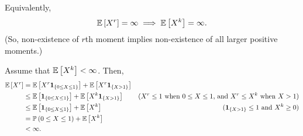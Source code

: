 \begin{enumerate}
\begin{proposition}
\begin{note}
Equivalently,
\[
\mathbb{E}\left[X^r\right]=\infty\implies \mathbb{E}\left[X^k\right]=\infty.
\]
(So, non-existence of \(r\)th moment implies non-existence of
all larger positive moments.)
\end{note}
\end{proposition}
\begin{pf}
Assume that \(\mathbb{E}\left[X^k\right]<\infty\). Then,
\begin{align*}
\mathbb{E}\left[X^r\right]&=\mathbb{E}\left[X^r\mathbf{1}_{\left\{0\le X\le 1\right\}}\right]+\mathbb{E}\left[X^r\mathbf{1}_{\left\{X>1\right\}}\right]\\
&\le \mathbb{E}\left[\mathbf{1}_{\left\{0\le X\le 1\right\}}\right]+\mathbb{E}\left[X^k\mathbf{1}_{\left\{X>1\right\}}\right] &\text{(\(X^r \le 1\) when \(0\le X\le 1\), and \(X^r\le X^k\) when \(X>1\))}\\
&\le \mathbb{E}\left[\mathbf{1}_{\left\{0\le X\le 1\right\}}\right]+\mathbb{E}\left[X^k\right]&\text{(\(\mathbf{1}_{\left\{X>1\right\}}\le 1\) and \(X^k\ge 0\))}\\
&=\mathbb{P}\left(0\le X\le 1\right)+\mathbb{E}\left[X^k\right]\\
&<\infty.
\end{align*}
\end{pf}


\end{enumerate}
